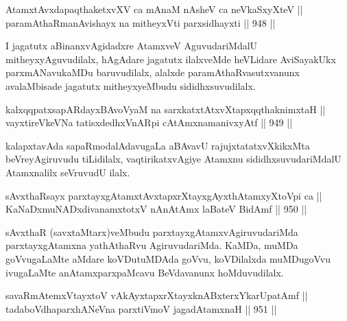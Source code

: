 
\begin{shl}
AtamxtAvxdapaqthaketxvXV ca mAnaM nAsheV ca neVkaSxyXteV || \\
paramAthaRmanAvishayx na mitheyxVti parxsidhayxti \hfill || 948 ||  
\end{shl}

\begin{artha}
I jagatutx aBinanxvAgidadxre AtamxveV AguvudariMdalU mitheyxyAguvudilalx, hAgAdare jagatutx ilalxveMde heVLidare AviSayakUkx parxmANavukaMDu baruvudilalx, alalxde paramAthaRvasutxvanunx avalaMbisade jagatutx mitheyxyeMbudu sididhxsuvudilalx.
\end{artha}


\begin{shl}
kalxqqpatxsapARdayxBAvoV\s yaM na sarxkatxtAtxvXtapxqqthaknimxtaH || \\
vayxtireVkeVNa tatisxdedhxVnARpi cA\s \s tAmxnamanivxyAtf \hfill || 949 ||  
\end{shl}

\begin{artha}
kalapxtavAda sapaRmodalAdavugaLa aBAvavU rajujxtatatxvXkikxMta beVreyAgiruvudu tiLidilalx, vaqtirikatxvAgiye Atamxnu sididhxsuvudariMdalU Atamxnalilx seVruvudU ilalx.
\end{artha}


\begin{shl}
sAvxthaRsayx parxtayxgAtamxtAvxtapxrXtayxgAyxthAtamxyXtoV\s pi ca || \\
KaNaDxmuNADxdivanamxtotxV nAnAtAmx laBateV BidAmf \hfill || 950 ||  
\end{shl}

\begin{artha}
sAvxthaR (savxtaMtarx)veMbudu parxtayxgAtamxvAgiruvudariMda parxtayxgAtamxna yathAthaRvu AgiruvudariMda. KaMDa, muMDa goVvugaLaMte aMdare koVDutuMDAda goVvu, koVDilalxda muMDugoVvu ivugaLaMte anAtamxparxpaMcavu BeVdavanunx hoMduvudilalx.
\end{artha}

\begin{shl}
savaRmAtemxVtayxtoV vAkAyxtapxrXtayxknABxterxYkarUpatAmf ||  \\
tadaboVdhaparxhANeVna parxtiVmoV jagadAtamxnaH \hfill || 951 ||  
\end{shl}

